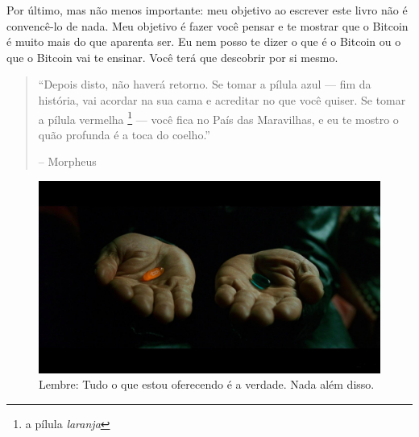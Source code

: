 Por último, mas não menos importante: meu objetivo ao escrever este livro não é convencê-lo de nada. Meu objetivo é fazer você pensar e te mostrar que o Bitcoin é muito mais do que aparenta ser. Eu nem posso te dizer o que é o Bitcoin ou o que o Bitcoin vai te ensinar. Você terá que descobrir por si mesmo.

\begin{quotation}\begin{samepage}
\enquote{Depois disto, não haverá retorno. Se tomar a pílula azul --- fim da história, vai acordar na sua cama e acreditar no que você quiser.  Se tomar a pílula vermelha \footnote{a pílula \textit{laranja}} --- você fica no País das Maravilhas, e eu te mostro o quão profunda é a toca do coelho.}
\begin{flushright} -- Morpheus
\end{flushright}\end{samepage}\end{quotation}

\begin{figure}
  \includegraphics{assets/images/bitcoin-orange-pill.jpg}
  \caption*{Lembre: Tudo o que estou oferecendo é a verdade. Nada além disso.}
  \label{fig:bitcoin-orange-pill}
\end{figure}

%
%
%
